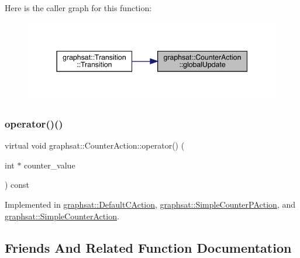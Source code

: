Here is the caller graph for this function\+:
\nopagebreak
\begin{figure}[H]
\begin{center}
\leavevmode
\includegraphics[width=344pt]{classgraphsat_1_1_counter_action_a09e8a5779f0ae70ea07e8974d93edf2e_icgraph}
\end{center}
\end{figure}
\mbox{\label{classgraphsat_1_1_counter_action_ac21660dc667a4abca69fdda313c6708c}} 
\subsubsection{\texorpdfstring{operator()()}{operator()()}}
{\footnotesize\ttfamily virtual void graphsat\+::\+Counter\+Action\+::operator() (\begin{DoxyParamCaption}\item[{int $\ast$}]{counter\+\_\+value }\end{DoxyParamCaption}) const\hspace{0.3cm}{\ttfamily [pure virtual]}}



Implemented in \mbox{\hyperlink{classgraphsat_1_1_default_c_action_a78b8f5f344c61e83c83fca04be2a4d73}{graphsat\+::\+Default\+C\+Action}}, \mbox{\hyperlink{classgraphsat_1_1_simple_counter_p_action_af73621e7e23c0da32f3cd957400fba84}{graphsat\+::\+Simple\+Counter\+P\+Action}}, and \mbox{\hyperlink{classgraphsat_1_1_simple_counter_action_abe1adcfe43f50662da5daddf59b94bb0}{graphsat\+::\+Simple\+Counter\+Action}}.



\subsection{Friends And Related Function Documentation}
\mbox{\label{classgraphsat_1_1_counter_action_ad4b3c25c041701ae56dc1e78df779d2f}} 
